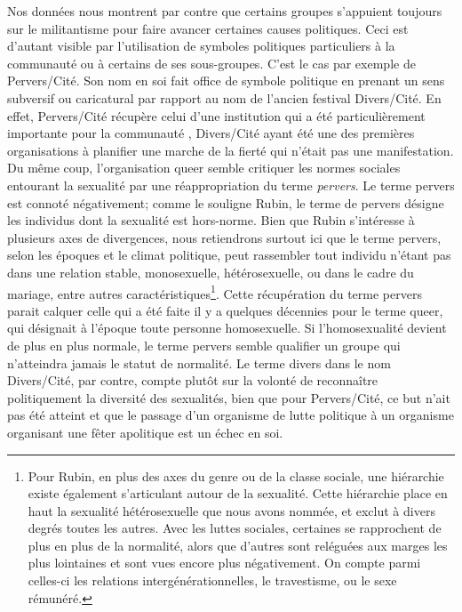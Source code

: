 Nos données nous montrent par contre que certains groupes s'appuient toujours sur le militantisme pour faire avancer certaines causes politiques.
Ceci est d'autant visible par l'utilisation de symboles politiques particuliers à la communauté \lgbt{} ou à certains de ses sous-groupes.
C'est le cas par exemple de Pervers/Cité.
Son nom en soi fait office de symbole politique en prenant un sens subversif ou caricatural par rapport au nom de l'ancien festival Divers/Cité.
En effet, Pervers/Cité récupère celui d'une institution qui a été particulièrement importante pour la communauté \lgbt{}, Divers/Cité ayant été une des premières organisations à planifier une marche de la fierté qui n'était pas une manifestation.\missref{}
Du même coup, l'organisation queer semble critiquer les normes sociales entourant la sexualité par une réappropriation du terme \emph{pervers}.
Le terme pervers est connoté négativement; comme le souligne Rubin, le terme de pervers désigne les individus dont la sexualité est hors-norme.
Bien que Rubin s'intéresse à plusieurs axes de divergences, nous retiendrons surtout ici que le terme pervers, selon les époques et le climat politique, peut rassembler tout individu n'étant pas dans une relation stable, monosexuelle, hétérosexuelle, ou dans le cadre du mariage, entre autres caractéristiques\footnote{Pour Rubin, en plus des axes du genre ou de la classe sociale, une hiérarchie existe également s'articulant autour de la sexualité. 
  Cette hiérarchie place en haut la sexualité hétérosexuelle que nous avons nommée, et exclut à divers degrés toutes les autres. 
  Avec les luttes sociales, certaines se rapprochent de plus en plus de la normalité, alors que d'autres sont reléguées aux marges les plus lointaines et sont vues encore plus négativement. 
  On compte parmi celles-ci les relations intergénérationnelles, le travestisme, ou le sexe rémunéré.
}.
Cette récupération du terme pervers parait calquer celle qui a été faite il y a quelques décennies pour le terme queer, qui désignait à l'époque toute personne homosexuelle.
Si l'homosexualité devient de plus en plus normale, le terme pervers semble qualifier un groupe qui n'atteindra jamais le statut de normalité.
Le terme divers dans le nom Divers/Cité, par contre, compte plutôt sur la volonté de reconnaître politiquement la diversité des sexualités, bien que pour Pervers/Cité, ce but n'ait pas été atteint et que le passage d'un organisme de lutte politique à un organisme organisant une fêter apolitique est un échec en soi.


